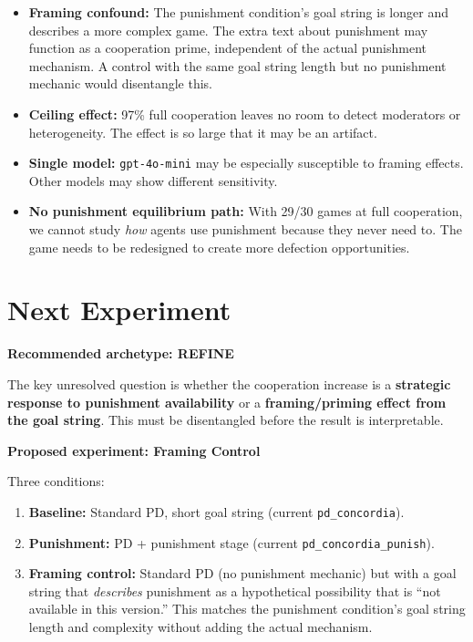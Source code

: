 \documentclass[11pt]{article}
\begin{document}
\begin{itemize}
\item \textbf{Framing confound:} The punishment condition's goal string is longer and describes a more complex game. The extra text about punishment may function as a cooperation prime, independent of the actual punishment mechanism. A control with the same goal string length but no punishment mechanic would disentangle this.
\item \textbf{Ceiling effect:} 97\% full cooperation leaves no room to detect moderators or heterogeneity. The effect is so large that it may be an artifact.
\item \textbf{Single model:} \texttt{gpt-4o-mini} may be especially susceptible to framing effects. Other models may show different sensitivity.
\item \textbf{No punishment equilibrium path:} With 29/30 games at full cooperation, we cannot study \emph{how} agents use punishment because they never need to. The game needs to be redesigned to create more defection opportunities.
\end{itemize}

\section*{Next Experiment}

\textbf{Recommended archetype: REFINE}

The key unresolved question is whether the cooperation increase is a \textbf{strategic response to punishment availability} or a \textbf{framing/priming effect from the goal string}. This must be disentangled before the result is interpretable.

\textbf{Proposed experiment: Framing Control}

Three conditions:
\begin{enumerate}
\item \textbf{Baseline:} Standard PD, short goal string (current \texttt{pd\_concordia}).
\item \textbf{Punishment:} PD + punishment stage (current \texttt{pd\_concordia\_punish}).
\item \textbf{Framing control:} Standard PD (no punishment mechanic) but with a goal string that \emph{describes} punishment as a hypothetical possibility that is ``not available in this version.'' This matches the punishment condition's goal string length and complexity without adding the actual mechanism.
\end{enumerate}
\end{document}

